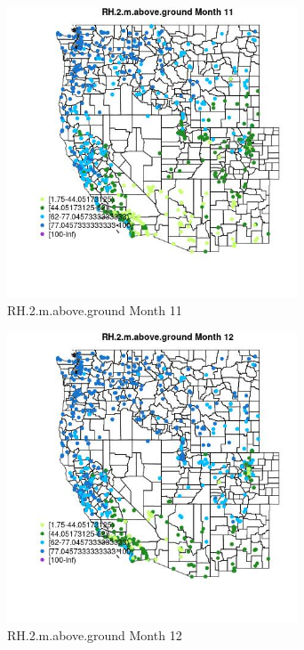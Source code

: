 \begin{figure} 
\centering  
\includegraphics[width=0.77\textwidth]{Code_Outputs/Report_ML_input_PM25_Step4_part_e_de_duplicated_aves_compiled_2019-05-21wNAs_MapObsMo11RH2maboveground.jpg} 
\caption{\label{fig:Report_ML_input_PM25_Step4_part_e_de_duplicated_aves_compiled_2019-05-21wNAsMapObsMo11RH2maboveground}RH.2.m.above.ground Month 11} 
\end{figure} 
 

\begin{figure} 
\centering  
\includegraphics[width=0.77\textwidth]{Code_Outputs/Report_ML_input_PM25_Step4_part_e_de_duplicated_aves_compiled_2019-05-21wNAs_MapObsMo12RH2maboveground.jpg} 
\caption{\label{fig:Report_ML_input_PM25_Step4_part_e_de_duplicated_aves_compiled_2019-05-21wNAsMapObsMo12RH2maboveground}RH.2.m.above.ground Month 12} 
\end{figure} 
 

